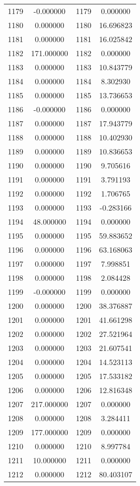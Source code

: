 \documentclass[12pt]{article}
\begin{document}
\begin{longtable}{@{}cccc@{}}
1179 & -0.000000 & 1179 & 0.000000 \\
1180 & 0.000000 & 1180 & 16.696823 \\
1181 & 0.000000 & 1181 & 16.025842 \\
1182 & 171.000000 & 1182 & 0.000000 \\
1183 & 0.000000 & 1183 & 10.843779 \\
1184 & 0.000000 & 1184 & 8.302930 \\
1185 & 0.000000 & 1185 & 13.736653 \\
1186 & -0.000000 & 1186 & 0.000000 \\
1187 & 0.000000 & 1187 & 17.943779 \\
1188 & 0.000000 & 1188 & 10.402930 \\
1189 & 0.000000 & 1189 & 10.836653 \\
1190 & 0.000000 & 1190 & 9.705616 \\
1191 & 0.000000 & 1191 & 3.791193 \\
1192 & 0.000000 & 1192 & 1.706765 \\
1193 & 0.000000 & 1193 & -0.283166 \\
1194 & 48.000000 & 1194 & 0.000000 \\
1195 & 0.000000 & 1195 & 59.883652 \\
1196 & 0.000000 & 1196 & 63.168063 \\
1197 & 0.000000 & 1197 & 7.998851 \\
1198 & 0.000000 & 1198 & 2.084428 \\
1199 & -0.000000 & 1199 & 0.000000 \\
1200 & 0.000000 & 1200 & 38.376887 \\
1201 & 0.000000 & 1201 & 41.661298 \\
1202 & 0.000000 & 1202 & 27.521964 \\
1203 & 0.000000 & 1203 & 21.607541 \\
1204 & 0.000000 & 1204 & 14.523113 \\
1205 & 0.000000 & 1205 & 17.533182 \\
1206 & 0.000000 & 1206 & 12.816348 \\
1207 & 217.000000 & 1207 & 0.000000 \\
1208 & 0.000000 & 1208 & 3.284411 \\
1209 & 177.000000 & 1209 & 0.000000 \\
1210 & 0.000000 & 1210 & 8.997784 \\
1211 & 10.000000 & 1211 & 0.000000 \\
1212 & 0.000000 & 1212 & 80.403107 \\

\end{longtable}
\end{document}
